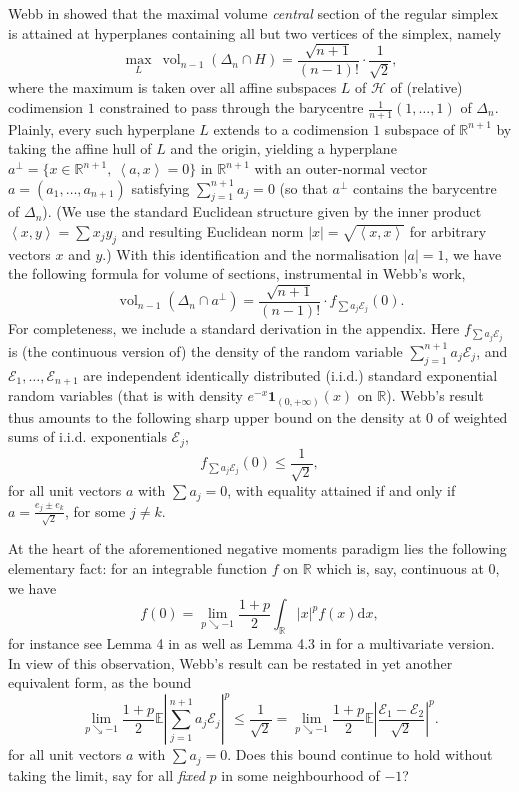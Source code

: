 \documentclass[10pt]{amsart}
\newcommand{\dd}{\mathrm{d}}
\newcommand{\E}{\mathbb{E}}
\newcommand{\1}{\textbf{1}}
\newcommand{\R}{\mathbb{R}}
\newcommand{\scal}[2]{\left\langle #1, #2 \right\rangle}
\newcommand{\red}{}
\newcommand{\cE}{\mathcal{E}}
\DeclareMathOperator{\vol}{vol}
\theoremstyle{remark}
\theoremstyle{definition}
\begin{document}
Webb in \cite{W} showed that the maximal volume  \emph{central} section of the regular simplex is attained at hyperplanes containing all but two vertices of the simplex, namely
\[ 
\max_{{\red L}} \ \vol_{n-1}(\Delta_n \cap H) = \frac{\sqrt{n+1}}{(n-1)!}\cdot\frac{1}{\sqrt2},
\]
where the maximum is taken over all affine subspaces {\red $L$} of $\mathcal{H}$ of (relative) codimension $1$ constrained to pass through the barycentre $\frac{1}{n+1}(1, \dots, 1)$ of $\Delta_n$. Plainly, every such hyperplane {\red $L$} extends to a codimension $1$ subspace of $\R^{n+1}$ by taking the affine hull of {\red $L$} and the origin, yielding a hyperplane $a^\perp = \{x \in \R^{n+1}, \ \scal{a}{x} = 0\}$ in $\R^{n+1}$ with an outer-normal vector $a = (a_1, \dots, a_{n+1})$ satisfying $\sum_{j=1}^{n+1} a_j = 0$ (so that $a^\perp$ contains the barycentre of $\Delta_n$). (We use the standard Euclidean structure given by the inner product $\scal{x}{y} = \sum x_jy_j$ and resulting Euclidean norm $|x| = \sqrt{\scal{x}{x}}$ for arbitrary vectors $x$ and $y$.) With this identification and the normalisation $|a| = 1$, we have the following formula for volume of sections, instrumental in Webb's work,
\begin{equation}\label{eq:vol-formula}
\vol_{n-1}(\Delta_n \cap a^\perp) = \frac{\sqrt{n+1}}{(n-1)!}\cdot f_{\sum a_j\cE_j}(0).
 \end{equation}
For completeness, we include a standard derivation in the appendix. Here $f_{\sum a_j\cE_j}$ is (the continuous version of) the density of the random variable $\sum_{j=1}^{n+1} a_j\cE_j$, and $\cE_1, \dots, \cE_{n+1}$ are independent identically distributed (i.i.d.) standard exponential random variables (that is with density $e^{-x}\1_{(0,+\infty)}(x)$ on $\R$). Webb's result thus amounts to the following sharp upper bound on the density at $0$ of weighted sums of i.i.d. exponentials $\cE_j$,
\begin{equation}\label{eq:Webb}
f_{\sum a_j\cE_j}(0) \leq \frac{1}{\sqrt2},
 \end{equation}
for all unit vectors $a$ with $\sum a_j = 0$, with equality attained if and only if $a = \frac{e_j \pm e_k}{\sqrt{2}}$, for some $j \neq k$.

At the heart of the aforementioned negative moments paradigm lies the following elementary fact: for an integrable function $f$ on $\R$ which is, say, continuous at $0$, we have
\[ 
f(0) = \lim_{p \searrow -1} \frac{1+p}{2}\int_{\R} |x|^pf(x) \dd x,
 \]
for instance see Lemma 4 in \cite{HL} as well as Lemma 4.3 in \cite{CNT} for a multivariate version.
In view of this observation, Webb's result can be restated in {\red yet another} equivalent form, as the bound
\begin{equation}\label{eq:Webb-lim}
 \lim_{p \searrow -1} \frac{1+p}{2}\E\left|\sum_{j=1}^{n+1} a_j \cE_j\right|^p \leq \frac{1}{\sqrt2} =  \lim_{p \searrow -1} \frac{1+p}{2}\E\left|\frac{\cE_1-\cE_2}{\sqrt2}\right|^p.
\end{equation}
for all unit vectors $a$ with $\sum a_j = 0$. Does this bound continue to hold without taking the limit, say for all \emph{fixed} $p$ in some neighbourhood of $-1$?
\end{document}
